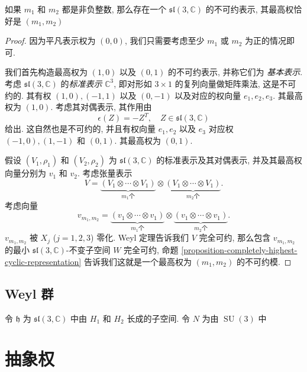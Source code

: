 \begin{proposition}
  如果 \( m_1 \) 和 \( m_2 \) 都是非负整数, 那么存在一个 \( \mathfrak{sl}(3,
  \mathbb{C}) \) 的不可约表示, 其最高权恰好是 \( (m_1, m_2) \)
\end{proposition}
\begin{proof}
  因为平凡表示权为 \( (0, 0) \), 我们只需要考虑至少 \( m_1 \) 或 \( m_2 \)
  为正的情况即可.

  我们首先构造最高权为 \( (1, 0) \) 以及 \( (0, 1) \) 的不可约表示, 并称它们为
  \emph{基本表示}. 考虑 \( \mathfrak{sl}(3, \mathbb{C}) \) 的\emph{标准表示} \(
  \mathbb{C}^3 \), 即对形如 \( 3 \times 1 \) 的复列向量做矩阵乘法, 这是不可约的.
  其有权 \( (1, 0), (-1, 1) \) 以及 \( (0, -1) \) 以及对应的权向量 \( e_1, e_2,
  e_3 \). 其最高权为 \( (1, 0) \).
  考虑其对偶表示, 其作用由
  \[
    \epsilon(Z) = -Z^T,\quad Z \in \mathfrak{sl}(3, \mathbb{C})
  \]
  给出. 这自然也是不可约的, 并且有权向量 \( e_1, e_2 \) 以及 \( e_3 \) 对应权 \(
  (-1, 0), (1, -1) \) 和 \( (0, 1) \). 其最高权为 \( (0, 1) \).

  假设 \( (V_1, \rho_1) \) 和 \( (V_2, \rho_2) \) 为 \( \mathfrak{sl}(3,
  \mathbb{C}) \) 的标准表示及其对偶表示, 并及其最高权向量分别为 \( v_1 \) 和 \(
  v_2\). 考虑张量表示
  \[
    V = \underbrace{(V_1 \otimes \cdots \otimes V_1)}_{m_1 \text{个}} \otimes
    \underbrace{(V_1 \otimes \cdots \otimes V_1)}_{m_2 \text{个}}.
  \]
  考虑向量
  \[
    v_{m_1, m_2}= \underbrace{(v_1 \otimes \cdots \otimes v_1)}_{m_1 \text{个}}
    \otimes \underbrace{(v_1 \otimes \cdots \otimes v_1)}_{m_2 \text{个}}.
  \]
  \( v_{m_1, m_2} \) 被 \( X_j \) (\( j = 1, 2, 3 \)) 零化. Weyl 定理告诉我们 \(
  V \) 完全可约, 那么包含 \( v_{m_1, m_2} \) 的最小 \( \mathfrak{sl}(3,
  \mathbb{C}) \)-不变子空间 \( W \) 完全可约, 命题
  \ref{proposition-completely-highest-cyclic-representation}
  告诉我们这就是一个最高权为 \( (m_1, m_2) \) 的不可约模.
\end{proof}

\subsection{Weyl 群}

令 \( \mathfrak{h} \) 为 \( \mathfrak{sl}(3, \mathbb{C}) \) 中由 \( H_1 \) 和 \(
H_2 \) 长成的子空间. 令 \( N \) 为由 \( \operatorname{SU}(3) \) 中

\section{抽象权}

